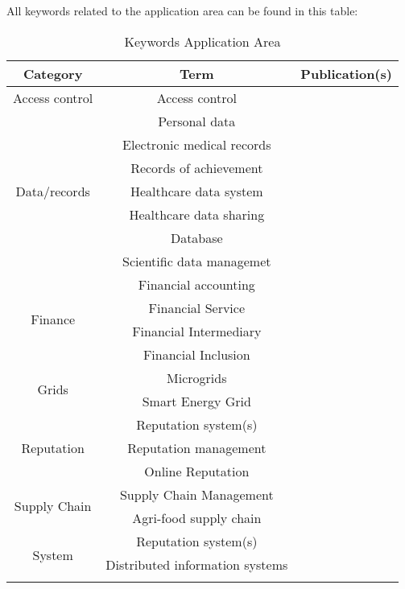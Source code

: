 \clearpage
All keywords related to the application area can be found in this table:
\begin{longtable}{ |c|c|p{4cm}| }
	\caption{Keywords Application Area} \\
	\hline
 	\textbf{Category} & \textbf{Term} & \textbf{Publication(s)} \\ [0.5ex] 
 	\hline\hline
 	Access control & Access control & \cite{2016_Azaria,2017_Ouaddah}\\ 
	 \hline
	 \multirow{7}{*}{Data/records} & Personal data & \cite{2015_Zyskind} \\  \cline{2-3}
	 & Electronic medical records & \cite{2016_Azaria} \\ \cline{2-3}
	 & Records of achievement & \cite{2016_Sharples} \\ \cline{2-3}
	 & Healthcare data system & \multirow{2}{*}{\cite{2016_Yue}} \\ \cline{2-2}
	 & Healthcare data sharing & \\ \cline{2-3}
	 & Database & \cite{2017_Coyne} \\ \cline{2-3}
	 & Scientific data managemet & \cite{2017_Gipp} \\
	 \hline
	 \multirow{4}{*}{Finance} & Financial accounting & \cite{2017_Coyne} \\ \cline{2-3}
	 & Financial Service & \multirow{3}{*}{\cite{2017_Jaag}} \\ \cline{2-2}
	 & Financial Intermediary &  \\ \cline{2-2}
	 & Financial Inclusion &  \\
	 \hline
	 \multirow{2}{*}{Grids} & Microgrids & \cite{2016_Kianmajd} \\ \cline{2-3}
	 & Smart Energy Grid & \cite{2018_Alessandra} \\
	 \hline
	 \multirow{3}{*}{Reputation} & Reputation system(s) & \cite{2015_Dennis,2016_Schaub} \\ \cline{2-3}
	 & Reputation management & \cite{2016_Sharples} \\ \cline{2-3}
	 & Online Reputation & \cite{2016_Yasin} \\
	 \hline
	 \multirow{2}{*}{Supply Chain} & Supply Chain Management & \cite{2017_Madhwal}\\ \cline{2-3}
	 & Agri-food supply chain & \cite{2016_Tian} \\
	 \hline
	 \multirow{5}{*}{System} & Reputation system(s) & \cite{2015_Dennis,2016_Schaub} \\ \cline{2-3}
	 & Distributed information systems & \cite{2016_Azaria} \\ \cline{2-3}

\end{longtable}
